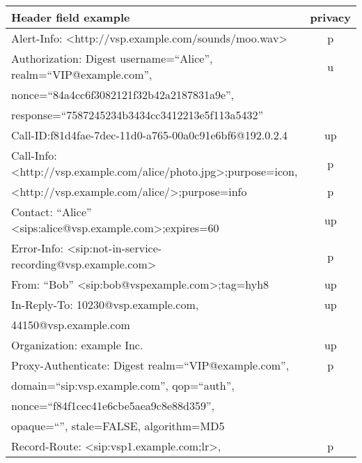 \documentclass[letterpaper,notitlepage,times,12pt]{article}
\begin{document}
\begin{table}[!th]
\begin{center}
\begin{tabular}{|l|c|} \hline
Header field example & privacy \\
\hline\hline
{\sf Alert-Info: \textless http://vsp.example.com/sounds/moo.wav\textgreater }& p\\ \hline
{\sf Authorization: Digest username=``Alice'', realm=``VIP@example.com'', }& u \\
{\sf \hspace{10pt}nonce=``84a4cc6f3082121f32b42a2187831a9e'',}& \\
{\sf \hspace{10pt}response=``7587245234b3434cc3412213e5f113a5432''} & \\ \hline
{\sf Call-ID:f81d4fae-7dec-11d0-a765-00a0c91e6bf6@192.0.2.4} & up \\ \hline
{\sf Call-Info: \textless http://vsp.example.com/alice/photo.jpg\textgreater;purpose=icon,} & p \\
{\sf \hspace{10pt}\textless http://vsp.example.com/alice/\textgreater;purpose=info} & p \\ \hline
{\sf Contact: ``Alice'' \textless sips:alice@vsp.example.com\textgreater;expires=60} & up \\ \hline
{\sf Error-Info: \textless sip:not-in-service-recording@vsp.example.com\textgreater} & p \\ \hline
{\sf From: ``Bob'' \textless sip:bob@vspexample.com\textgreater;tag=hyh8} & up \\ \hline
{\sf In-Reply-To: 10230@vsp.example.com,} & up \\
{\sf \hspace{10pt} 44150@vsp.example.com} & \\ \hline
{\sf Organization: example Inc.} & up \\ \hline
{\sf Proxy-Authenticate: Digest realm=``VIP@example.com'',} & p \\
{\sf \hspace{10pt} domain=``sip:vsp.example.com'', qop=``auth'',} & \\
{\sf \hspace{10pt} nonce=``f84f1cec41e6cbe5aea9c8e88d359'',} & \\
{\sf \hspace{10pt} opaque=``'', stale=FALSE, algorithm=MD5} & \\ \hline
{\sf Record-Route: \textless sip:vsp1.example.com;lr\textgreater,} & p \\

\end{tabular}
\end{center}
\end{table}
\end{document}
